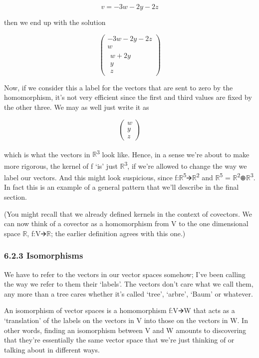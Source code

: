 \documentclass[oneside,english]{amsbook}
\numberwithin{section}{chapter}
\theoremstyle{plain}
\theoremstyle{definition}
\begin{document}
\[v = - 3w - 2y - 2z\]

then we end up with the solution

\[\begin{pmatrix}
	- 3w - 2y - 2z \\
	w \\
	\begin{matrix}
		w + 2y \\
		y \\
		z
	\end{matrix}
\end{pmatrix}\]

Now, if we consider this a label for the vectors that are sent to zero
by the homomorphism, it's not very efficient since the first and third
values are fixed by the other three. We may as well just write it as

\[\begin{pmatrix}
	w \\
	y \\
	z
\end{pmatrix}\]

which is what the vectors in $\mathbb{R}$\textsuperscript{3} look like.
Hence, in a sense we're about to make more rigorous, the kernel of f
`is' just $\mathbb{R}$\textsuperscript{3}, if we're allowed to change
the way we label our vectors. And this might look suspicious, since
f:$\mathbb{R}$\textsuperscript{5}🡪$\mathbb{R}$\textsuperscript{2} and
$\mathbb{R}$\textsuperscript{5} =
$\mathbb{R}$\textsuperscript{2}⊕$\mathbb{R}$\textsuperscript{3}. In fact
this is an example of a general pattern that we'll describe in the final
section.

(You might recall that we already defined kernels in the context of
covectors. We can now think of a covector as a homomorphism from V to
the one dimensional space $\mathbb{R}$, f:V🡪$\mathbb{R}$; the earlier
definition agrees with this one.)

\subsubsection{6.2.3 Isomorphisms}\label{isomorphisms}

We have to refer to the vectors in our vector spaces somehow; I've been
calling the way we refer to them their `labels'. The vectors don't
care what we call them, any more than a tree cares whether it's called
`tree', `arbre', `Baum' or whatever.

An isomorphism of vector spaces is a homomorphism f:V🡪W that acts as a
`translation' of the labels on the vectors in V into those on the
vectors in W. In other words, finding an isomorphism between V and W
amounts to discovering that they're essentially the same vector space
that we're just thinking of or talking about in different ways.
\end{document}
